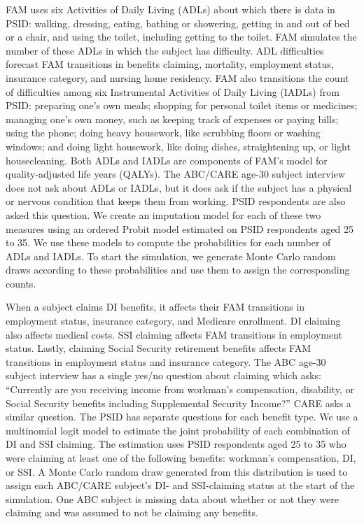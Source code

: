 \noindent FAM uses six Activities of Daily Living (ADLs) about which there is data in PSID: walking, dressing, eating, bathing or showering, getting in and out of bed or a chair, and using the toilet, including getting to the toilet.
FAM simulates the number of these ADLs in which the subject has difficulty.
ADL difficulties forecast FAM transitions in benefits claiming, mortality, employment status, insurance category, and nursing home residency.
FAM also transitions the count of difficulties among six Instrumental Activities of Daily Living (IADLs) from PSID: preparing one's own meals; shopping for personal toilet items or medicines; managing one's own money, such as keeping track of expenses or paying bills; using the phone; doing heavy housework, like scrubbing floors or washing windows; and doing light housework, like doing dishes, straightening up, or light housecleaning.
Both ADLs and IADLs are components of FAM's model for quality-adjusted life years (QALYs).
The ABC/CARE age-30 subject interview does not ask about ADLs or IADLs, but it does ask if the subject has a physical or nervous condition that keeps them from working.
PSID respondents are also asked this question.
We create an imputation model for each of these two measures using an ordered Probit model estimated on PSID respondents aged 25 to 35.
We use these models to compute the probabilities for each number of ADLs and IADLs. To start the simulation, we generate Monte Carlo random draws according to these probabilities and use them to assign the corresponding counts.

\noindent When a subject claims DI benefits, it affects their FAM transitions in employment status, insurance category, and Medicare enrollment.
DI claiming also affects medical costs.
SSI claiming affects FAM transitions in employment status.
Lastly, claiming Social Security retirement benefits affects FAM transitions in employment status and insurance category.
The ABC age-30 subject interview has a single yes/no question about claiming which asks: ``Currently are you receiving income from workman's compensation, disability, or Social Security benefits including Supplemental Security Income?'' CARE asks a similar question. The PSID has separate questions for each benefit type. We use a multinomial logit model to estimate the joint probability of each combination of DI and SSI claiming. The estimation uses PSID respondents aged 25 to 35 who were claiming at least one of the following benefits: workman's compensation, DI, or SSI. A Monte Carlo random draw generated from this distribution is used to assign each ABC/CARE subject's DI- and SSI-claiming status at the start of the simulation. One ABC subject is missing data about whether or not they were claiming and was assumed to not be claiming any benefits.

